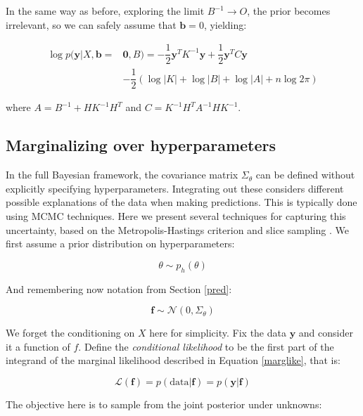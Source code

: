 \documentclass[10pt,a4paper,twoside]{book}
\begin{document}
In the same way as before, exploring the limit $B^{-1} \rightarrow O$, the prior becomes irrelevant, so we can safely assume that $\boldsymbol{b} = 0$, yielding:

\begin{align}
\log p(\boldsymbol{y}|X, \boldsymbol{b} =& \boldsymbol{0}, B) = -\dfrac{1}{2}\boldsymbol{y}^T K^{-1}\boldsymbol{y} + \dfrac{1}{2}\boldsymbol{y}^T C \boldsymbol{y}\\
&- \dfrac{1}{2}\left(\log |K| + \log |B| + \log |A| + n\log 2\pi \right)
\end{align}

where $A = B^{-1} + HK^{-1}H^T$ and $C = K^{-1}H^T A^{-1}HK^{-1}$.

\subsection{Marginalizing over hyperparameters}
\label{marginalize}

In the full Bayesian framework, the covariance matrix $\Sigma_{\theta}$ can be defined without explicitly specifying hyperparameters. Integrating out these considers different possible explanations of the data when making predictions. This is typically done using MCMC techniques. Here we present several techniques for capturing this uncertainty, based on the Metropolis-Hastings criterion and slice sampling \cite{Murray2010}. We first assume a prior distribution on hyperparameters:

\begin{equation}
\theta \sim p_{h}(\theta)
\end{equation}

And remembering now notation from Section \ref{pred}:

\begin{equation}
\boldsymbol{f} \sim \mathcal{N}(0, \Sigma_\theta)
\end{equation}

We forget the conditioning on $X$ here for simplicity. Fix the data $\boldsymbol{y}$ and consider it a function of $f$. Define the \textit{conditional likelihood} to be the first part of the integrand of the marginal likelihood described in Equation \ref{marglike}, that is:

\begin{equation}
\mathcal{L(\boldsymbol{f})} = p(\mathrm{data}|\boldsymbol{f}) = p(\boldsymbol{y}|\boldsymbol{f})
\end{equation}

The objective here is to sample from the joint posterior under unknowns:
\end{document}
